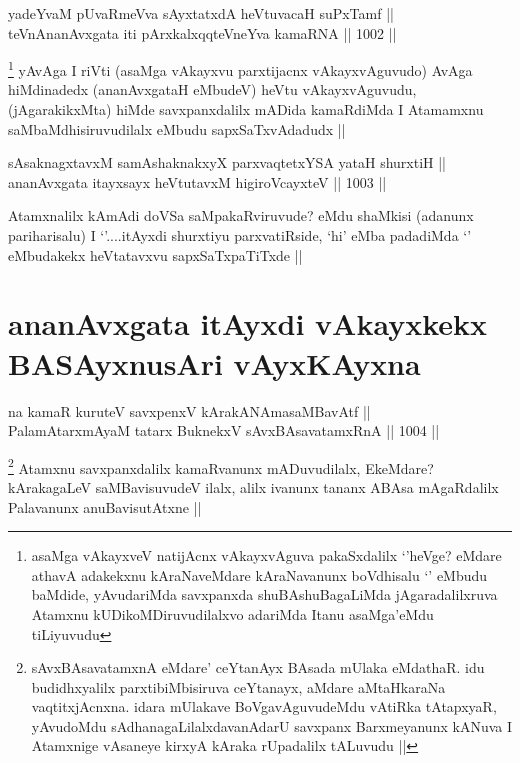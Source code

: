 
\begin{shl}
yadeYvaM pUvaRmeVva sAyxtatxdA heVtuvacaH suPxTamf || \\
teVnAnanAvxgata iti pArxkalxqqteVneYva kamaRNA ||  1002 ||  
\end{shl}

\begin{artha}
\footnote{asaMga vAkayxveV natijAcnx vAkayxvAguva pakaSxdalilx `\stext'heVge? eMdare athavA adakekxnu kAraNaveMdare kAraNavanunx boVdhisalu `\stext' eMbudu baMdide, yAvudariMda savxpanxda shuBAshuBagaLiMda jAgaradalilxruva Atamxnu kUDikoMDiruvudilalxvo adariMda Itanu asaMga'eMdu tiLiyuvudu}
yAvAga I riVti (asaMga vAkayxvu parxtijacnx vAkayxvAguvudo) AvAga hiMdinadedx (ananAvxgataH eMbudeV) heVtu vAkayxvAguvudu, (jAgarakikxMta) hiMde savxpanxdalilx mADida kamaRdiMda I Atamamxnu saMbaMdhisiruvudilalx eMbudu sapxSaTxvAdadudx ||
\end{artha}


\begin{shl}
sAsaknagxtavxM samAshaknakxyX parxvaqtetxYSA yataH shurxtiH || \\
ananAvxgata itayxsayx heVtutavxM higiroVcayxteV ||  1003 ||  
\end{shl}

\begin{artha}
Atamxnalilx kAmAdi doVSa saMpakaRviruvude? eMdu shaMkisi (adanunx pariharisalu) I `\stext'....itAyxdi shurxtiyu parxvatiRside, `hi' eMba padadiMda `\stext' eMbudakekx heVtatavxvu sapxSaTxpaTiTxde ||
\end{artha}

\section*{ananAvxgata itAyxdi vAkayxkekx BASAyxnusAri vAyxKAyxna}


\begin{shl}
na kamaR kuruteV savxpenxV kArakANAmasaMBavAtf || \\
PalamAtarxmAyaM tatarx BuknekxV sAvxBAsavatamxRnA ||  1004 ||  
\end{shl}

\begin{artha}
\footnote{sAvxBAsavatamxnA eMdare' ceYtanAyx BAsada mUlaka eMdathaR. idu budidhxyalilx parxtibiMbisiruva ceYtanayx, aMdare aMtaHkaraNa vaqtitxjAcnxna. idara mUlakave BoVgavAguvudeMdu vAtiRka tAtapxyaR, yAvudoMdu sAdhanagaLilalxdavanAdarU savxpanx Barxmeyanunx kANuva I Atamxnige vAsaneye kirxyA kAraka rUpadalilx tALuvudu ||}
Atamxnu savxpanxdalilx kamaRvanunx mADuvudilalx, EkeMdare? kArakagaLeV saMBavisuvudeV ilalx, alilx ivanunx tananx ABAsa mAgaRdalilx Palavanunx anuBavisutAtxne ||
\end{artha}

